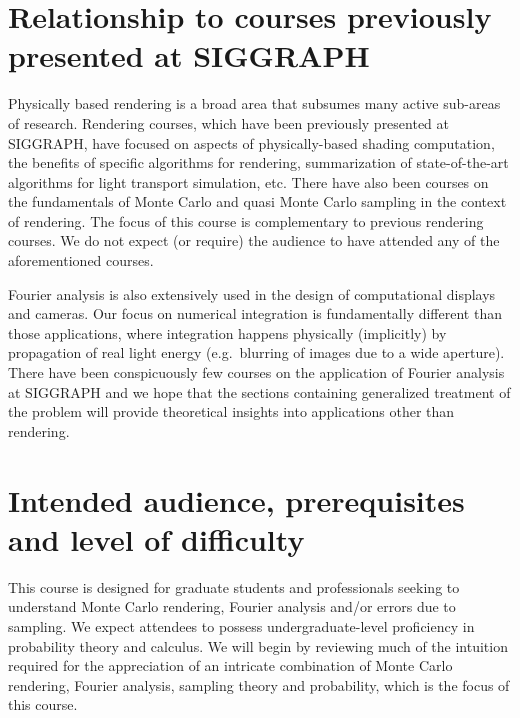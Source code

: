 \documentclass[11pt,fleqn]{book} %
\begin{document}
{
\section*{Relationship to courses previously presented at SIGGRAPH}
Physically based rendering is a broad area that subsumes many active sub-areas of research.  
Rendering courses, which have been previously presented at SIGGRAPH, have focused on aspects of physically-based shading computation, the benefits of specific algorithms for rendering, summarization of state-of-the-art algorithms for light transport simulation, etc. There have also been courses on the fundamentals of Monte Carlo and quasi Monte Carlo sampling in the context of rendering. The focus of this course is complementary to previous rendering courses. We do not expect (or require) the audience to have attended any of the aforementioned courses.

Fourier analysis is also extensively used in the design of computational displays and cameras. Our focus on numerical integration is fundamentally different than those applications, where integration happens physically (implicitly) by propagation of real light energy  (e.g.~blurring of images due to a wide aperture). There have been conspicuously few courses on the application of Fourier analysis at SIGGRAPH and we hope that the sections containing generalized treatment of the problem will provide theoretical insights into applications other than rendering. 
}

\section*{Intended audience, prerequisites and level of difficulty}
This course is designed for graduate students and professionals seeking to understand Monte Carlo rendering, Fourier analysis and/or errors due to sampling. We expect attendees to possess undergraduate-level proficiency in probability theory and calculus. We will begin by reviewing much of the intuition required for the appreciation of an intricate combination of Monte Carlo rendering, Fourier analysis, sampling theory and probability, which is the focus of this course.
\clearpage


\end{document}
